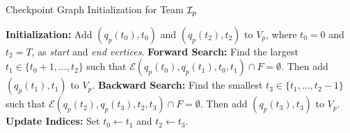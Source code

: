 \documentclass[10pt,twocolumn,twoside]{IEEEtran}
\newcommand{\news}{\color{blue}}
\begin{document}
  \begin{algorithm}\label{alg:graph}
  \caption{Checkpoint Graph Initialization for Team $\mathcal{I}_p$}
  {\news \begin{algorithmic}[1]
  \State \textbf{Initialization:} Add $(q_{p}(t_0),t_0)$ and $(q_{p}(t_2),t_2)$ to $V_{p}$, where $t_{0} = 0$ and $t_{2} = T$, as \emph{start} and \emph{end vertices}.
      \State \textbf{Forward Search:} Find the largest $t_{1} \in \{t_{0}+1, \dots, t_{2}\}$ such that $\mathcal{E}(q_{p}(t_{0}),q_{p}(t_{1}), t_{0},t_{1}) \cap F = \emptyset$. Then add $(q_{p}(t_{1}),t_{1})$ to $V_{p}$.
      \State \textbf{Backward Search:} Find the smallest $t_{3}\in\{t_{1}, \dots, t_{2}-1\}$ such that $
      \mathcal{E}(q_{p}(t_{2}),q_{p}(t_{3}), t_{2},t_{3}) \cap F = \emptyset.$ Then add $(q_{p}(t_{3}),t_{3})$ to $V_{p}$.
      \State \textbf{Update Indices:} Set $t_{0} \leftarrow t_{1}$ and $t_{2} \leftarrow t_{3}$.
  \EndWhile
  \end{algorithmic}}
  \end{algorithm}
\end{document}

